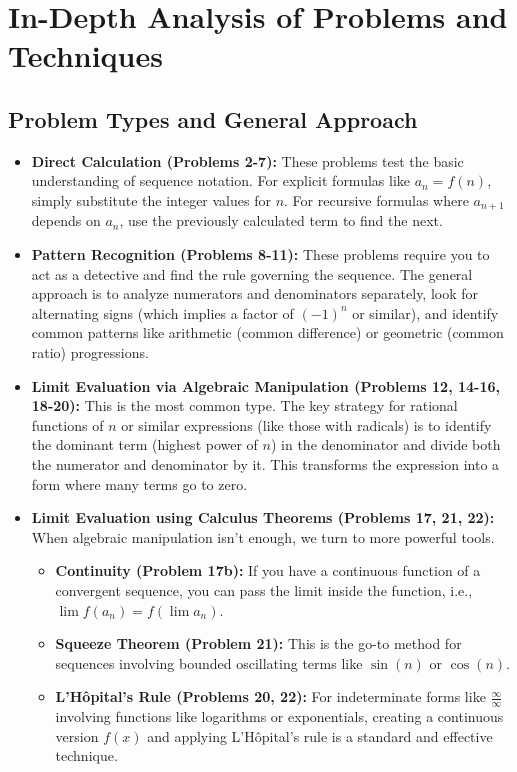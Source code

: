 \documentclass{article}
\begin{document}
\section{In-Depth Analysis of Problems and Techniques}

\subsection{Problem Types and General Approach}
\begin{itemize}
    \item \textbf{Direct Calculation (Problems 2-7):} These problems test the basic understanding of sequence notation. For explicit formulas like $a_n = f(n)$, simply substitute the integer values for $n$. For recursive formulas where $a_{n+1}$ depends on $a_n$, use the previously calculated term to find the next.
    
    \item \textbf{Pattern Recognition (Problems 8-11):} These problems require you to act as a detective and find the rule governing the sequence. The general approach is to analyze numerators and denominators separately, look for alternating signs (which implies a factor of $(-1)^n$ or similar), and identify common patterns like arithmetic (common difference) or geometric (common ratio) progressions.

    \item \textbf{Limit Evaluation via Algebraic Manipulation (Problems 12, 14-16, 18-20):} This is the most common type. The key strategy for rational functions of $n$ or similar expressions (like those with radicals) is to identify the dominant term (highest power of $n$) in the denominator and divide both the numerator and denominator by it. This transforms the expression into a form where many terms go to zero.

    \item \textbf{Limit Evaluation using Calculus Theorems (Problems 17, 21, 22):} When algebraic manipulation isn't enough, we turn to more powerful tools.
        \begin{itemize}
            \item \textbf{Continuity (Problem 17b):} If you have a continuous function of a convergent sequence, you can pass the limit inside the function, i.e., $\lim f(a_n) = f(\lim a_n)$.
            \item \textbf{Squeeze Theorem (Problem 21):} This is the go-to method for sequences involving bounded oscillating terms like $\sin(n)$ or $\cos(n)$.
            \item \textbf{L'Hôpital's Rule (Problems 20, 22):} For indeterminate forms like $\frac{\infty}{\infty}$ involving functions like logarithms or exponentials, creating a continuous version $f(x)$ and applying L'Hôpital's rule is a standard and effective technique.
        \end{itemize}
\end{itemize}
\end{document}
